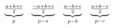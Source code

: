 \documentclass[preview]{standalone}
\begin{document}
\begin{align*}
\special{dvisvgm:raw <g id='unique000'>}\underbrace{\tfrac{a+b+c}{2}}_{p}\quad\underbrace{\tfrac{-a+b+c}{2}}_{p-a}\quad\underbrace{\tfrac{a-b+c}{2}}_{p-b}\quad\underbrace{\tfrac{a+b-c}{2}}_{p-c}\special{dvisvgm:raw </g>}
\end{align*}
\end{document}
